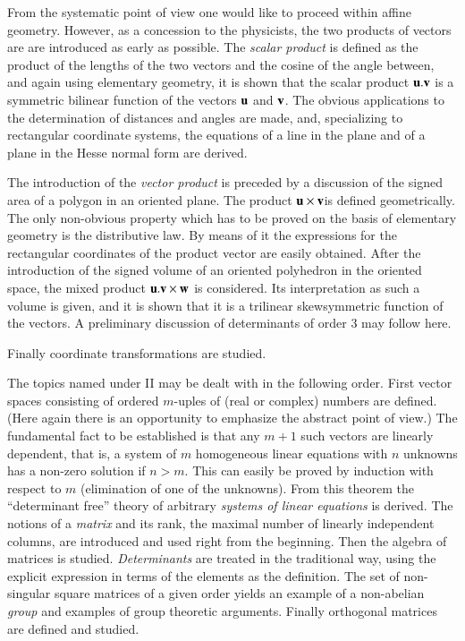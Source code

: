 From the systematic point of view one would like to proceed within
affine geometry. However, as a concession to the physicists, the two
products of vectors are  are introduced as early as possible. The
\textit{scalar product} is defined as the product of the lengths of
the two vectors and the cosine of the angle between, and again using
elementary geometry, it is shown that the scalar product $\mathbf{u}.\mathbf{v}$ is
a symmetric bilinear function of the vectors $\mathbf{u}$ and $\mathbf{v}$. The
obvious applications to the determination of distances and angles are
made, and, specializing to rectangular coordinate systems, the
equations of a line in the plane and of a plane in the Hesse normal
form are derived. 

The introduction of the \textit{vector product} is preceded by a
discussion of the signed area of a polygon in an oriented plane. The
product $\mathbf{u} \times \mathbf{v}$\pageoriginale is defined geometrically. The only
non-obvious property which has to be proved on the basis of elementary
geometry is the distributive law. By means of it the expressions for
the rectangular coordinates of the product vector are easily
obtained. After the introduction of the signed volume of an oriented
polyhedron in the oriented space, the mixed product $\mathbf{u}.\mathbf{v} \times
\mathbf{w}$ is considered. Its interpretation as such a volume is given, and
it is shown that it is a trilinear  skewsymmetric function of the
vectors. A preliminary discussion of determinants of order 3 may
follow here.

Finally coordinate transformations are studied.

The topics named under II may be dealt with in the following
order. First vector spaces consisting of ordered $m$-uples of (real or
complex) numbers are defined. (Here again there is an opportunity to
emphasize the abstract point of view.) The fundamental fact to be
established is that any $m+1$ such vectors are linearly dependent,
that is, a system of $m$ homogeneous linear equations with $n$ unknowns
has a non-zero solution if $n>m$. This can easily be proved by
induction with respect to $m$ (elimination of one of the
unknowns). From this theorem the ``determinant free'' theory of
arbitrary \textit{systems of linear equations} is derived. The notions
of a \textit{matrix} and its rank, the maximal number of linearly
independent columns, are introduced and used right from the
beginning. Then the algebra of matrices is
studied. \textit{Determinants} are treated in the traditional way,
using the explicit expression in terms of the elements as the
definition. The set of non-singular square matrices of a given order
yields an example of a non-abelian \textit{group} and examples of
group theoretic arguments. Finally orthogonal matrices are defined and
studied.

